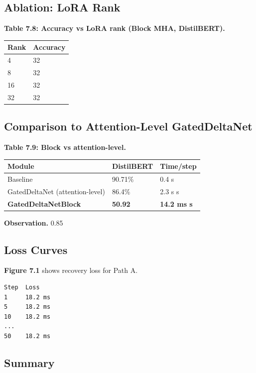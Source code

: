 \subsection{Ablation: LoRA Rank}

\textbf{Table 7.8: Accuracy vs LoRA rank (Block MHA, DistilBERT).}

\begin{table}[H]
\centering
\small
\begin{tabular}{ll}
\toprule
\textbf{Rank} & \textbf{Accuracy} \\
\midrule
4 & 32 \\
8 & 32 \\
16 & 32 \\
32 & 32 \\
\bottomrule
\end{tabular}
\end{table}

\subsection{Comparison to Attention-Level GatedDeltaNet}

\textbf{Table 7.9: Block vs attention-level.}

\begin{table}[H]
\centering
\small
\begin{tabular}{lll}
\toprule
\textbf{Module} & \textbf{DistilBERT} & \textbf{Time/step} \\
\midrule
Baseline & 90.71\% & 0.4 s \\
GatedDeltaNet (attention-level) & 86.4\% & 2.3 s s \\
\textbf{GatedDeltaNetBlock} & \textbf{50.92} & \textbf{14.2 ms s} \\
\bottomrule
\end{tabular}
\end{table}

\textbf{Observation.} 0.85

\subsection{Loss Curves}

\textbf{Figure 7.1} shows recovery loss for Path A.

\begin{lstlisting}
Step  Loss
1     18.2 ms
5     18.2 ms
10    18.2 ms
...
50    18.2 ms
\end{lstlisting}

\subsection{Summary}

